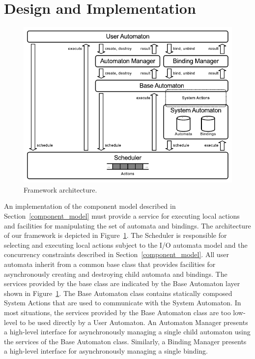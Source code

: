 \section{Design and Implementation\label{design}}

\begin{figure}
\center
\includegraphics[width=\textwidth]{architecture}
\caption{Framework architecture.}
\label{framework_architecture}
\end{figure}

An implementation of the component model described in Section~\ref{component_model} must provide a service for executing local actions and facilities for manipulating the set of automata and bindings.
The architecture of our framework is depicted in Figure~\ref{framework_architecture}.
The Scheduler is responsible for selecting and executing local actions subject to the I/O automata model and the concurrency constraints described in Section~\ref{component_model}.
All user automata inherit from a common base class that provides facilities for asynchronously creating and destroying child automata and bindings.
The services provided by the base class are indicated by the Base Automaton layer shown in Figure~\ref{framework_architecture}.
The Base Automaton class contains statically composed System Actions that are used to communicate with the System Automaton.
In most situations, the services provided by the Base Automaton class are too low-level to be used directly by a User Automaton.
An Automaton Manager presents a high-level interface for asynchronously managing a single child automaton using the services of the Base Automaton class.
Similarly, a Binding Manager presents a high-level interface for asynchronously managing a single binding.

